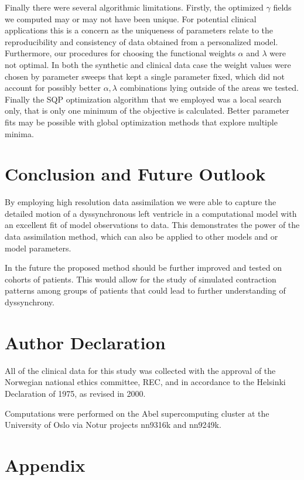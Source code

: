 Finally there were several algorithmic limitations. 
Firstly, the optimized $\gamma$ fields we computed may or may not have been unique.
For potential clinical applications this is a concern as the uniqueness of parameters
relate to the reproducibility and consistency of data obtained from a personalized
model. Furthermore, our procedures for
choosing the functional weights $\alpha$ and $\lambda$ were not optimal.
In both the synthetic
and clinical data case the weight values
were chosen by parameter sweeps that kept a single parameter fixed, which did not
account for possibly better $\alpha,\lambda$ combinations
lying outside of the areas we tested. 
Finally the SQP optimization algorithm that we employed 
was a local search only, that is only
one minimum of the objective is calculated. Better parameter fits may be possible
with global optimization methods that explore multiple minima.

\section{Conclusion and Future Outlook}
\label{paper1:sec:conclusion}
By employing high resolution data assimilation we
were able to capture the detailed motion of a dyssynchronous left
ventricle in a computational model with an excellent fit of model observations
to data. This demonstrates the power of the data assimilation method,
which can also be applied to other models and or model parameters.

In the future the proposed method should be further improved and 
tested on cohorts of patients. This would allow for the study of simulated contraction patterns 
among groups of patients that could lead to further understanding of
dyssynchrony.

\section{Author Declaration}
All of the clinical data for this study was collected with the approval of the Norwegian national ethics committee, REC,
and in accordance to the Helsinki Declaration of 1975, as revised in 2000.

Computations were performed on the Abel supercomputing cluster at the
University of Oslo via Notur projects nn9316k and nn9249k.

\section{Appendix}

